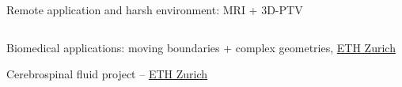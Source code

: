 \begin{frame}[label=app-13]{Remote application and harsh environment: MRI + 3D-PTV}
    \begin{columns}
        \centering{}
    \end{columns}
\end{frame}

\begin{frame}[label=app-14]{Biomedical applications: moving boundaries + complex geometries, \href{https://www.dropbox.com/s/p1xnc7mefoqboti/aorta_rigid.mp4?dl=0}{ETH Zurich}}
\centering{}
\end{frame}

\begin{frame}[label=app-15]{Cerebrospinal fluid project -- \href{https://idsc.ethz.ch/research-guzzella-onder/research-projects/ProjectArchive/csf-biothermofluidics.html}{ETH Zurich}}
\end{frame}
    
    
